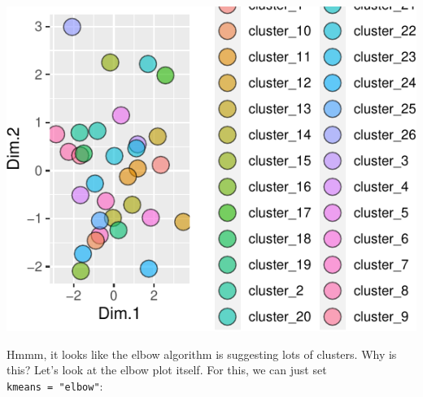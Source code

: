 \documentclass[
]{krantz}
\begin{document}
\begin{center}\includegraphics{index_files/figure-latex/unnamed-chunk-103-1} \end{center}

Hmmm, it looks like the elbow algorithm is suggesting lots of clusters. Why is this? Let's look at the elbow plot itself. For this, we can just set \texttt{kmeans\ =\ "elbow"}:
\end{document}
